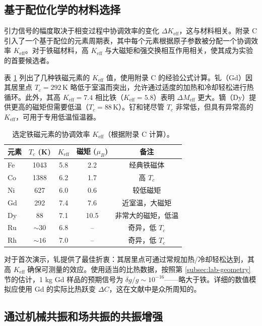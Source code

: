 \documentclass[12pt]{article}
\theoremstyle{remark}
\newcommand{\Keff}{K_{\mathrm{eff}}}
\begin{document}
	\subsection{基于配位化学的材料选择}
	\label{subsec:material-choice}
	
	引力信号的幅度取决于相变过程中协调效率的变化 $\Delta \Keff$，这与材料相关。附录 C 引入了一个基于配位的元素周期表，其中每个元素根据原子参数被分配一个协调效率 $\Keff$。对于铁磁材料，高 $\Keff$ 与大磁矩和强交换相互作用相关，使其成为实验的首要候选者。
	
	表 \ref{tab:ferro-keff-appP} 列出了几种铁磁元素的 $\Keff$ 值，使用附录 C 的经验公式计算。钆（Gd）因其居里点 $T_c = 292\,\mathrm{K}$ 略低于室温而突出，允许通过适度的加热和冷却轻松进行热循环。此外，其高 $\Keff = 7.4$ 相比铁（$\Keff = 5.8$）表明 $\Delta M_{\mathrm{eff}}$ 更大。镝（Dy）提供更高的磁矩但需要低温（$T_c = 88\,\mathrm{K}$）。钌和铑尽管 $T_c$ 非常低，但具有异常高的 $\Keff$，可用于专用低温恒温器。
	
	\begin{table}[htbp]
		\centering
		\caption{选定铁磁元素的协调效率 \(\Keff\)（根据附录 C 计算）。}
		\label{tab:ferro-keff-appP}
		\begin{tabular}{lcccc}
			\toprule
			元素 & \(T_c\) (K) & \(\Keff\) & 磁矩 (\(\mu_B\)) & 备注 \\
			\midrule
			Fe & 1043 & 5.8 & 2.2 & 经典铁磁体 \\
			Co & 1388 & 6.2 & 1.7 & 高 \(T_c\) \\
			Ni & 627  & 6.0 & 0.6 & 较低磁矩 \\
			Gd & 292  & 7.4 & 7.6 & 近室温，大磁矩 \\
			Dy & 88   & 7.1 & 10.5 & 非常大的磁矩，低温 \\
			Ru & \(\sim 30\) & 6.8 & -- & 奇异，低 \(T_c\) \\
			Rh & \(\sim 16\) & 7.0 & -- & 奇异，低 \(T_c\) \\
			\bottomrule
		\end{tabular}
	\end{table}
	
	对于首次演示，钆提供了最佳折衷：其居里点可通过常规加热/冷却轻松达到，其高 $\Keff$ 确保可测量的效应。使用适当的比热数据，按照第 \ref{subsec:lab-geometry} 节的估计，1 kg Gd 样品的预期信号为 $\delta g/g \sim 10^{-16}$——略大于铁。详细的数值模拟应使用 Gd 的实际比热跃变 $\Delta C$，这在文献中是众所周知的。
	
	\subsection{通过机械共振和场共振的共振增强}
	\label{subsec:resonant-enhancement}
	
\end{document}
